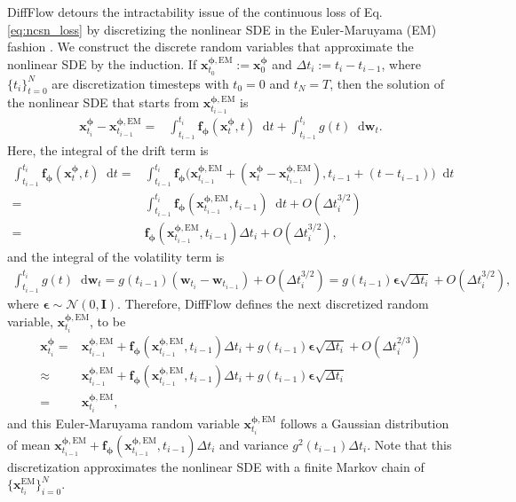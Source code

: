 \documentclass{article}
\theoremstyle{definition}
\theoremstyle{remark}
\newcommand*\diff{\mathop{}\!\mathrm{d}}
\begin{document}
	DiffFlow detours the intractability issue of the continuous loss of Eq. \eqref{eq:ncsn_loss} by discretizing the nonlinear SDE in the Euler-Maruyama (EM) fashion \cite{higham2001algorithmic}. We construct the discrete random variables that approximate the nonlinear SDE by the induction. If $\mathbf{x}_{t_{0}}^{\bm{\phi},\text{EM}}:=\mathbf{x}_{0}^{\bm{\phi}}$ and $\Delta t_{i}:=t_{i}-t_{i-1}$, where $\{t_{i}\}_{t=0}^{N}$ are discretization timesteps with $t_{0}=0$ and $t_{N}=T$, then the solution of the nonlinear SDE that starts from $\mathbf{x}_{t_{i-1}}^{\bm{\phi},\text{EM}}$ is
	\begin{align}\label{eq:approximate_diffflow}
	\mathbf{x}_{t_{i}}^{\bm{\phi}}-\mathbf{x}_{t_{i-1}}^{\bm{\phi},\text{EM}}=&\int_{t_{i-1}}^{t_{i}}\mathbf{f}_{\bm{\phi}}(\mathbf{x}_{t}^{\bm{\phi}},t)\diff t+\int_{t_{i-1}}^{t_{i}}g(t)\diff\mathbf{w}_{t}.
	\end{align}
	Here, the integral of the drift term is 
	\begin{align*}
	\int_{t_{i-1}}^{t_{i}}\mathbf{f}_{\bm{\phi}}(\mathbf{x}_{t}^{\bm{\phi}},t)\diff t=&\int_{t_{i-1}}^{t_{i}}\mathbf{f}_{\bm{\phi}}\big(\mathbf{x}_{t_{i-1}}^{\bm{\phi},\text{EM}}+(\mathbf{x}_{t}^{\bm{\phi}}-\mathbf{x}_{t_{i-1}}^{\bm{\phi},\text{EM}}),t_{i-1}+(t-t_{i-1})\big)\diff t\\
	=&\int_{t_{i-1}}^{t_{i}}\mathbf{f}_{\bm{\phi}}(\mathbf{x}_{t_{i-1}}^{\bm{\phi},\text{EM}},t_{i-1})\diff t+O(\Delta t_{i}^{3/2})\\
	=&\mathbf{f}_{\bm{\phi}}(\mathbf{x}_{t_{i-1}}^{\bm{\phi},\text{EM}},t_{i-1})\Delta t_{i}+O(\Delta t_{i}^{3/2}),
	\end{align*}
	and the integral of the volatility term is 
	\begin{align*}
	\int_{t_{i-1}}^{t_{i}}g(t)\diff\mathbf{w}_{t}=g(t_{i-1})(\mathbf{w}_{t_{i}}-\mathbf{w}_{t_{i-1}})+O(\Delta t_{i}^{3/2})=g(t_{i-1})\bm{\epsilon}\sqrt{\Delta t_{i}}+O(\Delta t_{i}^{3/2}),
	\end{align*}
	where $\bm{\epsilon}\sim\mathcal{N}(0,\mathbf{I})$. Therefore, DiffFlow defines the next discretized random variable, $\mathbf{x}_{t_{i}}^{\bm{\phi},\text{EM}}$, to be
	\begin{align*}
	\mathbf{x}_{t_{i}}^{\bm{\phi}}=&\mathbf{x}_{t_{i-1}}^{{\bm{\phi}},\text{EM}}+\mathbf{f}_{\bm{\phi}}(\mathbf{x}_{t_{i-1}}^{{\bm{\phi}},\text{EM}},t_{i-1})\Delta t_{i}+g(t_{i-1})\bm{\epsilon}\sqrt{\Delta t_{i}}+O(\Delta t_{i}^{2/3})\\
	\approx&\mathbf{x}_{t_{i-1}}^{{\bm{\phi}},\text{EM}}+\mathbf{f}_{\bm{\phi}}(\mathbf{x}_{t_{i-1}}^{{\bm{\phi}},\text{EM}},t_{i-1})\Delta t_{i}+g(t_{i-1})\bm{\epsilon}\sqrt{\Delta t_{i}}\\
	=&\mathbf{x}_{t_{i}}^{{\bm{\phi}},\text{EM}},
	\end{align*}
	and this Euler-Maruyama random variable $\mathbf{x}_{t_{i}}^{\bm{\phi},\text{EM}}$ follows a Gaussian distribution of mean $\mathbf{x}_{t_{i-1}}^{\bm{\phi},\text{EM}}+\mathbf{f}_{\bm{\phi}}(\mathbf{x}_{t_{i-1}}^{\bm{\phi},\text{EM}},t_{i-1})\Delta t_{i}$ and variance $g^{2}(t_{i-1})\Delta t_{i}$. Note that this discretization approximates the nonlinear SDE with a finite Markov chain of $\{\mathbf{x}_{t_{i}}^{\text{EM}}\}_{i=0}^{N}$. 
	
\end{document}
